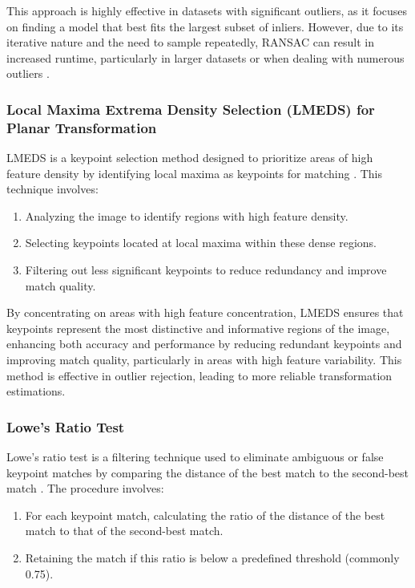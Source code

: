 This approach is highly effective in datasets with significant outliers, as it focuses on finding a model that best fits the largest subset of inliers. However, due to its iterative nature and the need to sample repeatedly, RANSAC can result in increased runtime, particularly in larger datasets or when dealing with numerous outliers \cite{ransac1981random}.

\subsubsection{Local Maxima Extrema Density Selection (LMEDS) for Planar Transformation}

LMEDS is a keypoint selection method designed to prioritize areas of high feature density by identifying local maxima as keypoints for matching \cite{lmeds2002local}. This technique involves:

\begin{enumerate} 
    \item Analyzing the image to identify regions with high feature density. 
    \item Selecting keypoints located at local maxima within these dense regions. 
    \item Filtering out less significant keypoints to reduce redundancy and improve match quality.
\end{enumerate}

By concentrating on areas with high feature concentration, LMEDS ensures that keypoints represent the most distinctive and informative regions of the image, enhancing both accuracy and performance by reducing redundant keypoints and improving match quality, particularly in areas with high feature variability. This method is effective in outlier rejection, leading to more reliable transformation estimations.

\subsubsection{Lowe's Ratio Test}

Lowe's ratio test is a filtering technique used to eliminate ambiguous or false keypoint matches by comparing the distance of the best match to the second-best match \cite{lowe2004}. The procedure involves:

\begin{enumerate} 
    \item For each keypoint match, calculating the ratio of the distance of the best match to that of the second-best match. 
    \item Retaining the match if this ratio is below a predefined threshold (commonly 0.75). 
\end{enumerate}


